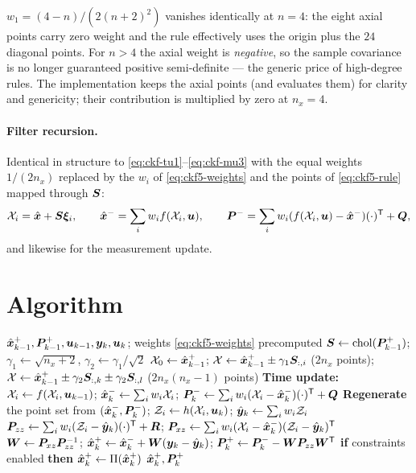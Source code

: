 \begin{remark}[$n_x = 4$ is a special case]\label{rm:ckf5-n4}
$w_1 = (4-n)/(2(n+2)^2)$ vanishes identically at $n = 4$: the eight axial points carry zero
weight and the rule effectively uses the origin plus the $24$ diagonal points. For $n > 4$
the axial weight is \emph{negative}, so the sample covariance is no longer guaranteed
positive semi-definite --- the generic price of high-degree rules. The implementation keeps
the axial points (and evaluates them) for clarity and genericity; their contribution is
multiplied by zero at $n_x=4$.
\end{remark}

\paragraph{Filter recursion.} Identical in structure to \eqref{eq:ckf-tu1}--\eqref{eq:ckf-mu3}
with the equal weights $1/(2n_x)$ replaced by the $w_i$ of \eqref{eq:ckf5-weights} and the
points of \eqref{eq:ckf5-rule} mapped through $\bm{S}$:
\begin{equation}
\mathcal{X}_i = \hat{\bm{x}} + \bm{S}\bm{\xi}_i, \qquad
\hat{\bm{x}}^{-} = \sum_i w_i f(\mathcal{X}_i,\bm{u}), \qquad
\bm{P}^{-} = \sum_i w_i (f(\mathcal{X}_i,\bm{u})-\hat{\bm{x}}^{-})(\cdot)^{\mathsf{T}} + \bm{Q},
\label{eq:ckf5-recursion}
\end{equation}
and likewise for the measurement update.

\section{Algorithm}
\begin{algorithm}[H]
\caption{CKF5 --- one sampling period (additive noise)}
\begin{algorithmic}[1]
\Require $\hat{\bm{x}}^{+}_{k-1},\bm{P}^{+}_{k-1},\bm{u}_{k-1},\bm{y}_k,\bm{u}_k$; weights \eqref{eq:ckf5-weights} precomputed
\State $\bm{S}\gets\operatorname{chol}(\bm{P}^{+}_{k-1})$;\;
       $\gamma_1\gets\sqrt{n_x+2}$,\; $\gamma_2\gets\gamma_1/\sqrt2$
\State $\mathcal{X}_0\gets\hat{\bm{x}}^{+}_{k-1}$;\;
       $\mathcal{X}\gets\hat{\bm{x}}^{+}_{k-1}\pm\gamma_1\bm{S}_{:,i}$ ($2n_x$ points);\;
       $\mathcal{X}\gets\hat{\bm{x}}^{+}_{k-1}\pm\gamma_2\bm{S}_{:,k}\pm\gamma_2\bm{S}_{:,l}$ ($2n_x(n_x{-}1)$ points)
\State \textbf{Time update:} $\mathcal{X}_i\gets f(\mathcal{X}_i,\bm{u}_{k-1})$;\;
       $\hat{\bm{x}}^{-}_k\gets\sum_i w_i\mathcal{X}_i$;\;
       $\bm{P}^{-}_k\gets\sum_i w_i(\mathcal{X}_i-\hat{\bm{x}}^{-}_k)(\cdot)^{\mathsf{T}}+\bm{Q}$
\State \textbf{Regenerate} the point set from $(\hat{\bm{x}}^{-}_k,\bm{P}^{-}_k)$;\;
       $\mathcal{Z}_i\gets h(\mathcal{X}_i,\bm{u}_k)$;\; $\hat{\bm{y}}_k\gets\sum_i w_i\mathcal{Z}_i$
\State $\bm{P}_{zz}\gets\sum_i w_i(\mathcal{Z}_i-\hat{\bm{y}}_k)(\cdot)^{\mathsf{T}}+\bm{R}$;\;
       $\bm{P}_{xz}\gets\sum_i w_i(\mathcal{X}_i-\hat{\bm{x}}^{-}_k)(\mathcal{Z}_i-\hat{\bm{y}}_k)^{\mathsf{T}}$
\State $\bm{W}\gets\bm{P}_{xz}\bm{P}_{zz}^{-1}$;\; $\hat{\bm{x}}^{+}_k\gets\hat{\bm{x}}^{-}_k+\bm{W}(\bm{y}_k-\hat{\bm{y}}_k)$;\;
       $\bm{P}^{+}_k\gets\bm{P}^{-}_k-\bm{W}\bm{P}_{zz}\bm{W}^{\mathsf{T}}$
\State \textbf{if} constraints enabled \textbf{then} $\hat{\bm{x}}^{+}_k\gets\Pi(\hat{\bm{x}}^{+}_k)$
\Ensure $\hat{\bm{x}}^{+}_k,\bm{P}^{+}_k$
\end{algorithmic}
\end{algorithm}

